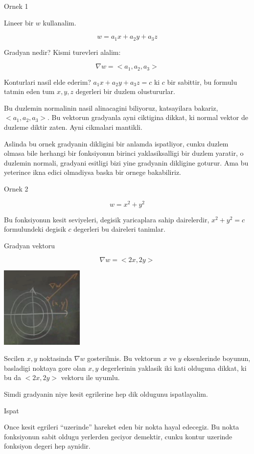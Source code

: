 \documentclass[12pt,fleqn]{article}
\begin{document}
Ornek 1

Lineer bir $w$ kullanalim. 

\[ w = a_1 x + a_2 y + a_3 z \]

Gradyan nedir? Kismi turevleri alalim:

\[ \nabla w = <a_1, a_2, a_3> \]

Konturlari nasil elde ederim? $a_1 x + a_2 y + a_3 z  = c$ ki $c$ bir
sabittir, bu formulu tatmin eden tum $x,y,z$ degerleri bir duzlem
olustururlar. 

Bu duzlemin normalinin nasil alinacagini biliyoruz, katsayilara bakariz,
$<a_1,a_2,a_3>$. Bu vektorun gradyanla ayni ciktigina dikkat, ki normal
vektor de duzleme diktir zaten. Ayni cikmalari mantikli. 

Aslinda bu ornek gradyanin dikligini bir anlamda ispatliyor, cunku duzlem
olmasa bile herhangi bir fonksiyonun birinci yaklasiksalligi bir duzlem
yaratir, o duzlemin normali, gradyani esitligi bizi yine gradyanin
dikligine goturur. Ama bu yeterince ikna edici olmadiysa baska bir ornege
bakabiliriz. 

Ornek 2

\[ w = x^2 + y^2 \]

Bu fonksiyonun kesit seviyeleri, degisik yaricaplara sahip dairelerdir,
$x^2 + y^2 = c$ formulundeki degisik $c$ degerleri bu daireleri tanimlar. 

Gradyan vektoru

\[ \nabla w = <2x, 2y> \]

\includegraphics[height=4cm]{12_2.png}

Secilen $x,y$ noktasinda $\nabla w$ gosterilmis. Bu vektorun $x$ ve $y$
eksenlerinde boyunun, basladigi noktaya gore olan $x,y$ degerlerinin
yaklasik iki kati olduguna dikkat, ki bu da $<2x,2y>$ vektoru ile uyumlu. 

Simdi gradyanin niye kesit egrilerine hep dik oldugunu ispatlayalim.

Ispat

Once kesit egrileri ``uzerinde'' hareket eden bir nokta hayal edecegiz. Bu
nokta fonksiyonun sabit oldugu yerlerden geciyor demektir, cunku kontur
uzerinde fonksiyon degeri hep aynidir. 
\end{document}

